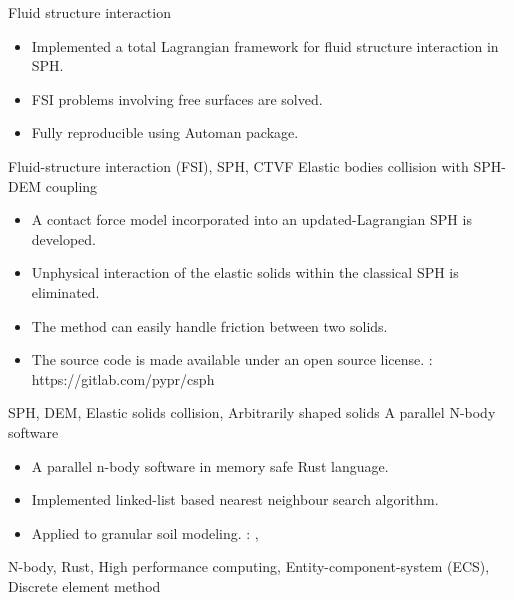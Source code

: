 \begin{experiences}
  \emptySeparator
  \experience
  {} {Fluid structure interaction}{}{}
  {}    {
    \begin{itemize}
        \item Implemented a total Lagrangian framework for fluid structure interaction in SPH.
        \item FSI problems involving free surfaces are solved.
        \item Fully reproducible using Automan package.
    \end{itemize}
  }
  {Fluid-structure interaction (FSI), SPH, CTVF}
  \emptySeparator
  \experience
  {} {Elastic bodies collision with SPH-DEM coupling}{}{}
  {} {
                      \begin{itemize}
                      \item  A contact force model incorporated into an updated-Lagrangian SPH is developed.
                      \item  Unphysical interaction of the elastic solids within the classical SPH is eliminated.
                      \item  The method can easily handle friction between two solids.
                      \item  The source code is made available under an open source license.
                        \faGithub:  {https://gitlab.com/pypr/csph}
                      \end{itemize}
                    }
                    {SPH, DEM, Elastic solids collision, Arbitrarily shaped solids}
  \emptySeparator
  \experience
  {} {A parallel N-body software}{}{}
  {}    {
    \begin{itemize}
      \item A parallel n-body software in memory safe Rust language.
      \item Implemented linked-list based nearest neighbour search algorithm.
      \item Applied to granular soil modeling.
        \faGithub: ,
    \end{itemize}
  }
  {N-body, Rust, High performance computing, Entity-component-system (ECS), Discrete element method}
\end{experiences}
